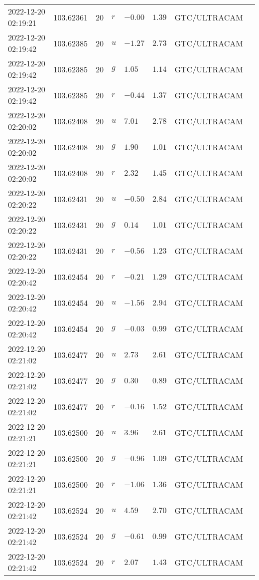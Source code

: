 \documentclass{nature_plusfigure}
\begin{document}
\begin{supplement}
\begin{center}
\begin{longtable}{llllllll}
2022-12-20 02:19:21 & 103.62361 & 20 & $r$ & $-0.00$ & $1.39$ & GTC/ULTRACAM &  \\ 
2022-12-20 02:19:42 & 103.62385 & 20 & $u$ & $-1.27$ & $2.73$ & GTC/ULTRACAM &  \\ 
2022-12-20 02:19:42 & 103.62385 & 20 & $g$ & $1.05$ & $1.14$ & GTC/ULTRACAM &  \\ 
2022-12-20 02:19:42 & 103.62385 & 20 & $r$ & $-0.44$ & $1.37$ & GTC/ULTRACAM &  \\ 
2022-12-20 02:20:02 & 103.62408 & 20 & $u$ & $7.01$ & $2.78$ & GTC/ULTRACAM &  \\ 
2022-12-20 02:20:02 & 103.62408 & 20 & $g$ & $1.90$ & $1.01$ & GTC/ULTRACAM &  \\ 
2022-12-20 02:20:02 & 103.62408 & 20 & $r$ & $2.32$ & $1.45$ & GTC/ULTRACAM &  \\ 
2022-12-20 02:20:22 & 103.62431 & 20 & $u$ & $-0.50$ & $2.84$ & GTC/ULTRACAM &  \\ 
2022-12-20 02:20:22 & 103.62431 & 20 & $g$ & $0.14$ & $1.01$ & GTC/ULTRACAM &  \\ 
2022-12-20 02:20:22 & 103.62431 & 20 & $r$ & $-0.56$ & $1.23$ & GTC/ULTRACAM &  \\ 
2022-12-20 02:20:42 & 103.62454 & 20 & $r$ & $-0.21$ & $1.29$ & GTC/ULTRACAM &  \\ 
2022-12-20 02:20:42 & 103.62454 & 20 & $u$ & $-1.56$ & $2.94$ & GTC/ULTRACAM &  \\ 
2022-12-20 02:20:42 & 103.62454 & 20 & $g$ & $-0.03$ & $0.99$ & GTC/ULTRACAM &  \\ 
2022-12-20 02:21:02 & 103.62477 & 20 & $u$ & $2.73$ & $2.61$ & GTC/ULTRACAM &  \\ 
2022-12-20 02:21:02 & 103.62477 & 20 & $g$ & $0.30$ & $0.89$ & GTC/ULTRACAM &  \\ 
2022-12-20 02:21:02 & 103.62477 & 20 & $r$ & $-0.16$ & $1.52$ & GTC/ULTRACAM &  \\ 
2022-12-20 02:21:21 & 103.62500 & 20 & $u$ & $3.96$ & $2.61$ & GTC/ULTRACAM &  \\ 
2022-12-20 02:21:21 & 103.62500 & 20 & $g$ & $-0.96$ & $1.09$ & GTC/ULTRACAM &  \\ 
2022-12-20 02:21:21 & 103.62500 & 20 & $r$ & $-1.06$ & $1.36$ & GTC/ULTRACAM &  \\ 
2022-12-20 02:21:42 & 103.62524 & 20 & $u$ & $4.59$ & $2.70$ & GTC/ULTRACAM &  \\ 
2022-12-20 02:21:42 & 103.62524 & 20 & $g$ & $-0.61$ & $0.99$ & GTC/ULTRACAM &  \\ 
2022-12-20 02:21:42 & 103.62524 & 20 & $r$ & $2.07$ & $1.43$ & GTC/ULTRACAM &  \\ 

\end{longtable}
\end{center}
\end{supplement}
\end{document}
